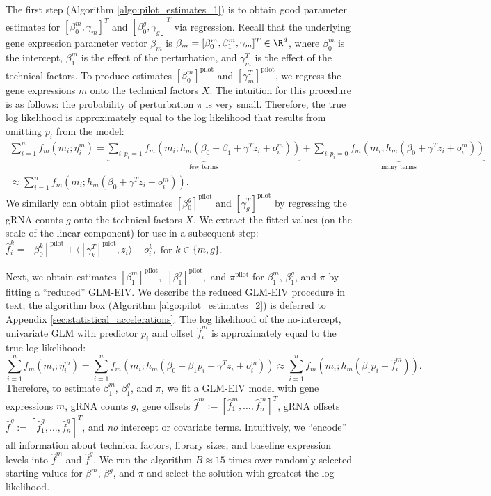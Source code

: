 \documentclass[11pt]{article}
\begin{document}
The first step (Algorithm \ref{algo:pilot_estimates_1}) is to obtain good parameter estimates for $[\beta^m_0, \gamma_m]^T$ and $[\beta^g_0, \gamma_g]^T$ via regression. Recall that the underlying gene expression parameter vector $\beta_m$ is $\beta_m = [\beta^m_0, \beta^m_1, \gamma_m]^T \in \R^d$, where $\beta^m_0$ is the intercept, $\beta^m_1$ is the effect of the perturbation, and $\gamma_m^T$ is the effect of the technical factors. To produce estimates $[\beta^m_0]^\textrm{pilot}$ and $[\gamma_m^T]^\textrm{pilot}$, we regress the gene expressions $m$ onto the technical factors $X$. The intuition for this procedure is as follows: the probability of perturbation $\pi$ is very small. Therefore, the true log likelihood is approximately equal to the log likelihood that results from omitting $p_i$ from the model:
\begin{multline*}
\sum_{i=1}^n f_m(m_i; \eta^m_i) = \underbrace{\sum_{i : p_i =1} f_m(m_i; h_m(\beta_0 + \beta_1 + \gamma^T z_i + o^m_i))}_\textrm{few terms}  + \underbrace{\sum_{i : p_i = 0} f_m(m_i; h_m(\beta_0 + \gamma^T z_i + o^m_i))}_\textrm{many terms} \\ \approx \sum_{i = 1}^n f_m(m_i; h_m(\beta_0 + \gamma^T z_i + o^m_i)).
\end{multline*}
We similarly can obtain pilot estimates $[\beta^g_0]^\textrm{pilot}$ and $[\gamma^T_g]^\textrm{pilot}$ by regressing the gRNA counts $g$ onto the technical factors $X$. We extract the fitted values (on the scale of the linear component) for use in a subsequent step: $\hat{f}^k_i = [\beta^k_0]^\textrm{pilot} + \langle [\gamma^T_k]^\textrm{pilot}, z_i \rangle + o^k_i,$ for $k \in \{m,g\}$.

Next, we obtain estimates $[\beta_1^m]^\textrm{pilot},$ $[\beta_1^g]^\textrm{pilot},$ and $\pi^\textrm{pilot}$ for $\beta^m_1$, $\beta^g_1$, and $\pi$ by fitting a ``reduced'' GLM-EIV. We describe the reduced GLM-EIV procedure in text; the algorithm box (Algorithm \ref{algo:pilot_estimates_2}) is deferred to Appendix \ref{sec:statistical_accelerations}. The log likelihood of the no-intercept, univariate GLM with predictor $p_i$ and offset $\hat{f}^m_i$ is approximately equal to the true log likelihood:
$$ \sum_{i=1}^n f_m(m_i; \eta^m_i) =
\sum_{i=1}^n f_m(m_i; h_m(\beta_0 + \beta_1 p_i + \gamma^T z_i + o^m_i)) \approx \sum_{i=1}^n f_m(m_i; h_m( \beta_1 p_i + \hat{f}^m_i)).
$$
Therefore, to estimate $\beta^m_1$, $\beta^g_1$, and $\pi$, we fit a GLM-EIV model with gene expressions $m$, gRNA counts $g$, gene offsets $\hat{f}^m := [\hat{f}^m_1, \dots, \hat{f}^m_n]^T$, gRNA offsets $\hat{f}^g := [\hat{f}^g_1, \dots, \hat{f}^g_n]^T$, and \textit{no} intercept or covariate terms. Intuitively, we ``encode'' all information about technical factors, library sizes, and baseline expression levels into $\hat{f}^m$ and $\hat{f}^g$. We run the algorithm $B \approx 15$ times over randomly-selected starting values for $\beta^m$, $\beta^g$, and $\pi$ and select the solution with greatest the log likelihood.
\end{document}
